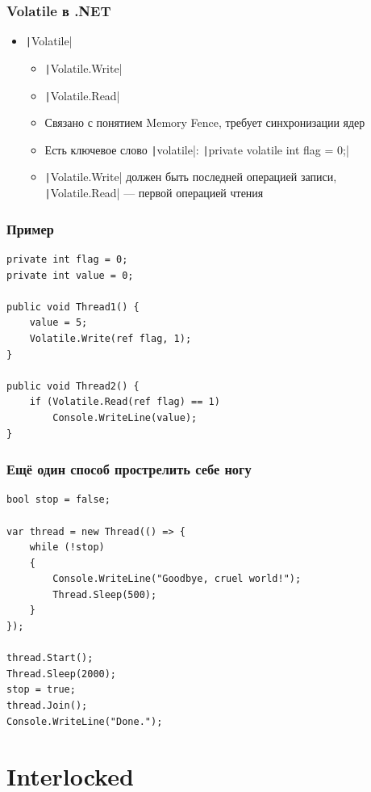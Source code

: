 \documentclass[xetex,mathserif,serif]{beamer}
\begin{document}
    \begin{frame}
        \frametitle{Volatile в .NET}
        \begin{itemize}
            \item \texttt|Volatile|
            \begin{itemize}
                \item \texttt|Volatile.Write|
                \item \texttt|Volatile.Read|
                \item Связано с понятием Memory Fence, требует синхронизации ядер
                \item Есть ключевое слово \texttt|volatile|: \texttt|private volatile int flag = 0;|
                \item \texttt|Volatile.Write| должен быть последней операцией записи, \texttt|Volatile.Read| --- первой операцией чтения
            \end{itemize}
        \end{itemize}
    \end{frame}

    \begin{frame}[fragile]
        \frametitle{Пример}
        \begin{verbatim}
private int flag = 0;
private int value = 0;

public void Thread1() {
    value = 5;
    Volatile.Write(ref flag, 1);
}

public void Thread2() {
    if (Volatile.Read(ref flag) == 1)
        Console.WriteLine(value);
}
        \end{verbatim}
    \end{frame}

    \begin{frame}[fragile]
        \frametitle{Ещё один способ прострелить себе ногу}
        \begin{verbatim}
bool stop = false;

var thread = new Thread(() => {
    while (!stop)
    {
        Console.WriteLine("Goodbye, cruel world!");
        Thread.Sleep(500);
    }
});

thread.Start();
Thread.Sleep(2000);
stop = true;
thread.Join();
Console.WriteLine("Done.");
        \end{verbatim}
    \end{frame}

    \section{Interlocked}
\end{document}
